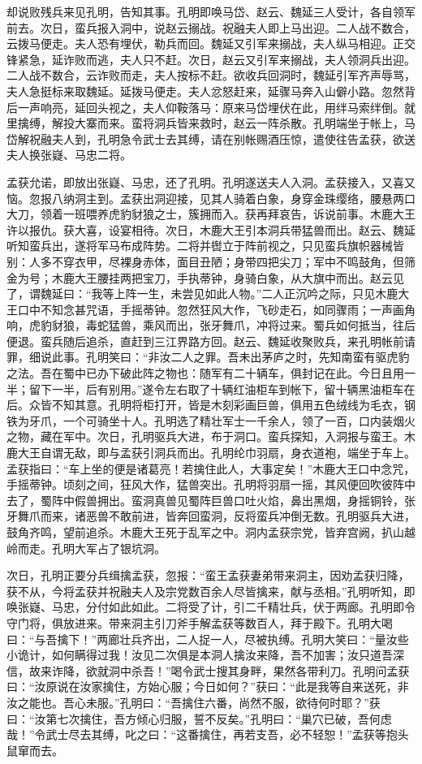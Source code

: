 却说败残兵来见孔明，告知其事。孔明即唤马岱、赵云、魏延三人受计，各自领军前去。次日，蛮兵报入洞中，说赵云搦战。祝融夫人即上马出迎。二人战不数合，云拨马便走。夫人恐有埋伏，勒兵而回。魏延又引军来搦战，夫人纵马相迎。正交锋紧急，延诈败而逃，夫人只不赶。次日，赵云又引军来搦战，夫人领洞兵出迎。二人战不数合，云诈败而走，夫人按标不赶。欲收兵回洞时，魏延引军齐声辱骂，夫人急挺标来取魏延。延拨马便走。夫人忿怒赶来，延骤马奔入山僻小路。忽然背后一声响亮，延回头视之，夫人仰鞍落马：原来马岱埋伏在此，用绊马索绊倒。就里擒缚，解投大寨而来。蛮将洞兵皆来救时，赵云一阵杀散。孔明端坐于帐上，马岱解祝融夫人到，孔明急令武士去其缚，请在别帐赐酒压惊，遣使往告孟获，欲送夫人换张嶷、马忠二将。

孟获允诺，即放出张嶷、马忠，还了孔明。孔明遂送夫人入洞。孟获接入，又喜又恼。忽报八纳洞主到。孟获出洞迎接，见其人骑着白象，身穿金珠缨络，腰悬两口大刀，领着一班喂养虎豹豺狼之士，簇拥而入。获再拜哀告，诉说前事。木鹿大王许以报仇。获大喜，设宴相待。次日，木鹿大王引本洞兵带猛兽而出。赵云、魏延听知蛮兵出，遂将军马布成阵势。二将并辔立于阵前视之，只见蛮兵旗帜器械皆别：人多不穿衣甲，尽裸身赤体，面目丑陋；身带四把尖刀；军中不鸣鼓角，但筛金为号；木鹿大王腰挂两把宝刀，手执蒂钟，身骑白象，从大旗中而出。赵云见了，谓魏延曰：“我等上阵一生，未尝见如此人物。”二人正沉吟之际，只见木鹿大王口中不知念甚咒语，手摇蒂钟。忽然狂风大作，飞砂走石，如同骤雨；一声画角响，虎豹豺狼，毒蛇猛兽，乘风而出，张牙舞爪，冲将过来。蜀兵如何抵当，往后便退。蛮兵随后追杀，直赶到三江界路方回。赵云、魏延收聚败兵，来孔明帐前请罪，细说此事。孔明笑曰：“非汝二人之罪。吾未出茅庐之时，先知南蛮有驱虎豹之法。吾在蜀中已办下破此阵之物也：随军有二十辆车，俱封记在此。今日且用一半；留下一半，后有别用。”遂令左右取了十辆红油柜车到帐下，留十辆黑油柜车在后。众皆不知其意。孔明将柜打开，皆是木刻彩画巨兽，俱用五色绒线为毛衣，钢铁为牙爪，一个可骑坐十人。孔明选了精壮军士一千余人，领了一百，口内装烟火之物，藏在军中。次日，孔明驱兵大进，布于洞口。蛮兵探知，入洞报与蛮王。木鹿大王自谓无敌，即与孟获引洞兵而出。孔明纶巾羽扇，身衣道袍，端坐于车上。孟获指曰：“车上坐的便是诸葛亮！若擒住此人，大事定矣！”木鹿大王口中念咒，手摇蒂钟。顷刻之间，狂风大作，猛兽突出。孔明将羽扇一摇，其风便回吹彼阵中去了，蜀阵中假兽拥出。蛮洞真兽见蜀阵巨兽口吐火焰，鼻出黑烟，身摇铜铃，张牙舞爪而来，诸恶兽不敢前进，皆奔回蛮洞，反将蛮兵冲倒无数。孔明驱兵大进，鼓角齐鸣，望前追杀。木鹿大王死于乱军之中。洞内孟获宗党，皆弃宫阙，扒山越岭而走。孔明大军占了银坑洞。

次日，孔明正要分兵缉擒孟获，忽报：“蛮王孟获妻弟带来洞主，因劝孟获归降，获不从，今将孟获并祝融夫人及宗党数百余人尽皆擒来，献与丞相。”孔明听知，即唤张嶷、马忠，分付如此如此。二将受了计，引二千精壮兵，伏于两廊。孔明即令守门将，俱放进来。带来洞主引刀斧手解孟获等数百人，拜于殿下。孔明大喝曰：“与吾擒下！”两廊壮兵齐出，二人捉一人，尽被执缚。孔明大笑曰：“量汝些小诡计，如何瞒得过我！汝见二次俱是本洞人擒汝来降，吾不加害；汝只道吾深信，故来诈降，欲就洞中杀吾！”喝令武士搜其身畔，果然各带利刀。孔明问孟获曰：“汝原说在汝家擒住，方始心服；今日如何？”获曰：“此是我等自来送死，非汝之能也。吾心未服。”孔明曰：“吾擒住六番，尚然不服，欲待何时耶？”获曰：“汝第七次擒住，吾方倾心归服，誓不反矣。”孔明曰：“巢穴已破，吾何虑哉！”令武士尽去其缚，叱之曰：“这番擒住，再若支吾，必不轻恕！”孟获等抱头鼠窜而去。

